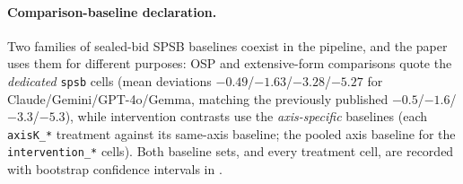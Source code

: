 \paragraph{Comparison-baseline declaration.} Two families of sealed-bid SPSB baselines coexist in the pipeline, and the paper uses them for different purposes: OSP and extensive-form comparisons quote the \emph{dedicated} \texttt{spsb} cells (mean deviations $-0.49$/$-1.63$/$-3.28$/$-5.27$ for Claude/Gemini/GPT-4o/Gemma, matching the previously published $-0.5$/$-1.6$/$-3.3$/$-5.3$), while intervention contrasts use the \emph{axis-specific} baselines (each \texttt{axisK\_*} treatment against its same-axis baseline; the pooled axis baseline for the \texttt{intervention\_*} cells). Both baseline sets, and every treatment cell, are recorded with bootstrap confidence intervals in .

